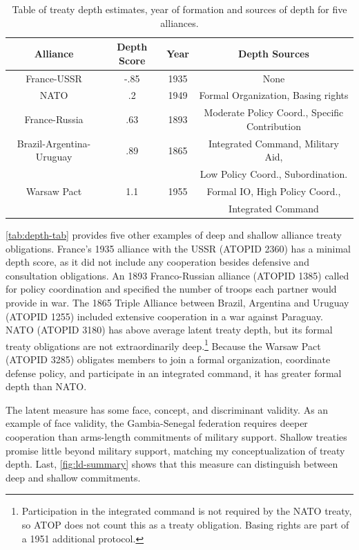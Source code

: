 \documentclass[12pt]{article}
\begin{document}
\begin{table}[hbt!]
\begin{center}
\begin{tabular}{cccc}
   Alliance  & Depth Score & Year & Depth Sources  \\
\hline
 France-USSR   & -.85  & 1935  & None \\
 NATO & .2 & 1949 & Formal Organization, Basing rights \\ 
 France-Russia   & .63 & 1893 & Moderate Policy Coord., Specific Contribution \\
 Brazil-Argentina-Uruguay & .89 & 1865 & Integrated Command, Military Aid, \\
                         &      &      &  Low Policy Coord., Subordination. \\
 Warsaw Pact & 1.1  & 1955 &  Formal IO, High Policy Coord., \\
             &      &      & Integrated Command  \\ 
\hline
\end{tabular}
\caption{Table of treaty depth estimates, year of formation and sources of depth for five alliances. }
\label{tab:depth-tab}
\end{center} 
\end{table}


\autoref{tab:depth-tab} provides five other examples of deep and shallow alliance treaty obligations.
France's 1935 alliance with the USSR (ATOPID 2360) has a minimal depth score, as it did not include any cooperation besides defensive and consultation obligations. 
An 1893 Franco-Russian alliance (ATOPID 1385) called for policy coordination and specified the number of troops each partner would provide in war.   
The 1865 Triple Alliance between Brazil, Argentina and Uruguay (ATOPID 1255) included extensive cooperation in a war against Paraguay. 
NATO (ATOPID 3180) has above average latent treaty depth, but its formal treaty obligations are not extraordinarily deep.\footnote{Participation in the integrated command is not required by the NATO treaty, so ATOP does not count this as a treaty obligation. Basing rights are part of a 1951 additional protocol.}
Because the Warsaw Pact (ATOPID 3285) obligates members to join a formal organization, coordinate defense policy, and participate in an integrated command, it has greater formal depth than NATO. 


The latent measure has some face, concept, and discriminant validity. 
As an example of face validity, the Gambia-Senegal federation requires deeper cooperation than arms-length commitments of military support. 
Shallow treaties promise little beyond military support, matching my conceptualization of treaty depth. 
Last, \autoref{fig:ld-summary} shows that this measure can distinguish between deep and shallow commitments. 
\end{document}
